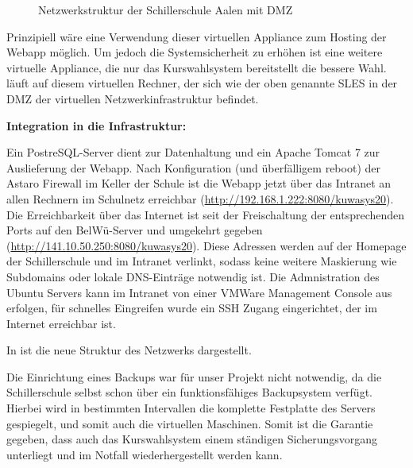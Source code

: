 \begin{figure}[H]
\begin{center}
\end{center}
\caption[\textbf{Netzwerkstruktur der Schillerschule Aalen}]{Netzwerkstruktur der Schillerschule Aalen mit DMZ}
\label{fig:Netzwerkstruktur}
\end{figure}

Prinzipiell wäre eine Verwendung dieser virtuellen \gls{Appliance} zum Hosting der \ac{Webapp} möglich. Um jedoch die Systemsicherheit zu erhöhen ist eine weitere virtuelle Appliance, die nur das Kurswahlsystem bereitstellt die bessere Wahl.
 läuft auf diesem virtuellen Rechner, der sich wie der oben genannte SLES in der \gls{DMZ} der virtuellen Netzwerkinfrastruktur befindet.

\textbf{Integration in die Infrastruktur:}

Ein PostreSQL-Server dient zur Datenhaltung und ein Apache Tomcat 7 zur Auslieferung der \ac{Webapp}. Nach Konfiguration (und überfälligem reboot) der Astaro Firewall im Keller der Schule ist die Webapp jetzt über das Intranet an allen Rechnern im Schulnetz erreichbar (\url{http://192.168.1.222:8080/kuwasys20}). Die Erreichbarkeit über das Internet ist seit der Freischaltung der entsprechenden Ports auf den BelWü-Server und umgekehrt gegeben (\url{http://141.10.50.250:8080/kuwasys20}).
Diese Adressen werden auf der Homepage der Schillerschule und im Intranet verlinkt, sodass keine weitere Maskierung wie Subdomains oder lokale DNS-Einträge notwendig ist.
Die Admnistration des Ubuntu Servers kann im Intranet von einer VMWare Management Console aus erfolgen, für schnelles Eingreifen wurde ein SSH Zugang eingerichtet, der im Internet erreichbar ist.

In  ist die neue Struktur des Netzwerks dargestellt.

Die Einrichtung eines Backups war für unser Projekt nicht notwendig, da die Schillerschule selbst schon über ein funktionsfähiges Backupsystem verfügt. Hierbei wird in bestimmten Intervallen die komplette Festplatte des Servers gespiegelt, und somit auch die virtuellen Maschinen.
Somit ist die Garantie gegeben, dass auch das Kurswahlsystem einem ständigen Sicherungsvorgang unterliegt und im Notfall wiederhergestellt werden kann.
